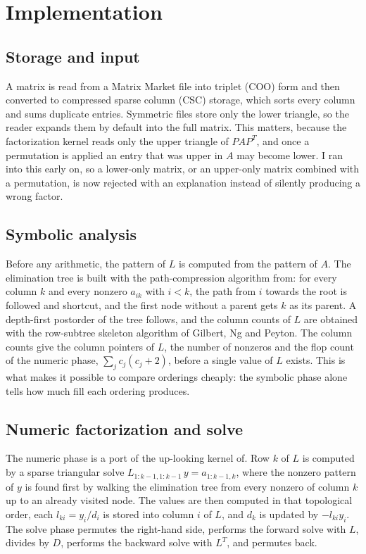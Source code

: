 \documentclass[conference]{IEEEtran}
\begin{document}
\section{Implementation}

\subsection{Storage and input}
A matrix is read from a Matrix Market file\cite{b9} into triplet (COO) form and then converted to compressed sparse column (CSC) storage, which sorts every column and sums duplicate entries. Symmetric files store only the lower triangle, so the reader expands them by default into the full matrix. This matters, because the factorization kernel reads only the upper triangle of $PAP^T$, and once a permutation is applied an entry that was upper in $A$ may become lower. I ran into this early on, so a lower-only matrix, or an upper-only matrix combined with a permutation, is now rejected with an explanation instead of silently producing a wrong factor.

\subsection{Symbolic analysis}
Before any arithmetic, the pattern of $L$ is computed from the pattern of $A$. The elimination tree is built with the path-compression algorithm from\cite{b1}: for every column $k$ and every nonzero $a_{ik}$ with $i<k$, the path from $i$ towards the root is followed and shortcut, and the first node without a parent gets $k$ as its parent. A depth-first postorder of the tree follows, and the column counts of $L$ are obtained with the row-subtree skeleton algorithm of Gilbert, Ng and Peyton\cite{b5}. The column counts give the column pointers of $L$, the number of nonzeros and the flop count of the numeric phase, $\sum_j c_j(c_j+2)$, before a single value of $L$ exists. This is what makes it possible to compare orderings cheaply: the symbolic phase alone tells how much fill each ordering produces.

\subsection{Numeric factorization and solve}
The numeric phase is a port of the up-looking kernel of\cite{b2}. Row $k$ of $L$ is computed by a sparse triangular solve $L_{1:k-1,1:k-1}\, y = a_{1:k-1,k}$, where the nonzero pattern of $y$ is found first by walking the elimination tree from every nonzero of column $k$ up to an already visited node. The values are then computed in that topological order, each $l_{ki}=y_i/d_i$ is stored into column $i$ of $L$, and $d_k$ is updated by $-l_{ki}y_i$. The solve phase permutes the right-hand side, performs the forward solve with $L$, divides by $D$, performs the backward solve with $L^T$, and permutes back.
\end{document}
